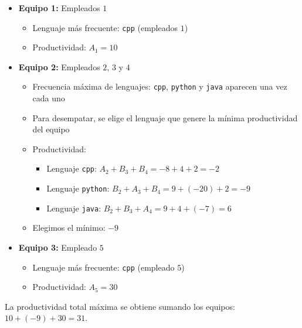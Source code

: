 \begin{itemize}
    \item \textbf{Equipo 1:} Empleados $1$
        \begin{itemize}
            \item Lenguaje más frecuente: \texttt{cpp} (empleados $1$)  
            \item Productividad: $A_1 = 10$
        \end{itemize}
    \item \textbf{Equipo 2:} Empleados $2$, $3$ y $4$
        \begin{itemize}
            \item Frecuencia máxima de lenguajes: \texttt{cpp}, \texttt{python} y \texttt{java} aparecen una vez cada uno  
            \item Para desempatar, se elige el lenguaje que genere la mínima productividad del equipo
            \item Productividad:  
            \begin{itemize}
                \item Lenguaje \texttt{cpp}: $A_2 + B_3 + B_4 = -8 + 4 + 2 = -2$  
                \item Lenguaje \texttt{python}: $B_2 + A_3 + B_4 = 9 + (-20) + 2 = -9$  
                \item Lenguaje \texttt{java}: $B_2 + B_3 + A_4 = 9 + 4 + (-7) = 6$
            \end{itemize}
            \item Elegimos el mínimo: $-9$
        \end{itemize}
    \item \textbf{Equipo 3:} Empleado $5$
        \begin{itemize}
            \item Lenguaje más frecuente: \texttt{cpp} (empleado $5$)  
            \item Productividad: $A_5 = 30$
        \end{itemize}
\end{itemize}

La productividad total máxima se obtiene sumando los equipos: $10 + (-9) + 30 = 31$.